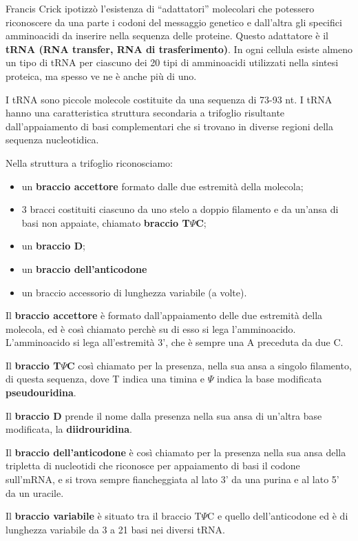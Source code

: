 \documentclass[]{article}
\begin{document}
Francis Crick ipotizzò l'esistenza di ``adattatori'' molecolari che
potessero riconoscere da una parte i codoni del messaggio genetico e
dall'altra gli specifici amminoacidi da inserire nella sequenza delle
proteine. Questo adattatore è il \textbf{tRNA (RNA transfer, RNA di
trasferimento)}. In ogni cellula esiste almeno un tipo di tRNA per
ciascuno dei 20 tipi di amminoacidi utilizzati nella sintesi proteica,
ma spesso ve ne è anche più di uno.

I tRNA sono piccole molecole costituite da una sequenza di 73-93 nt. I
tRNA hanno una caratteristica struttura secondaria a trifoglio
risultante dall'appaiamento di basi complementari che si trovano in
diverse regioni della sequenza nucleotidica.

Nella struttura a trifoglio riconosciamo:

\begin{itemize}
\itemsep1pt\parskip0pt
\item
  un \textbf{braccio accettore} formato dalle due estremità della
  molecola;
\item
  3 bracci costituiti ciascuno da uno stelo a doppio filamento e da
  un'ansa di basi non appaiate, chiamato \textbf{braccio T\(\Psi\)C};
\item
  un \textbf{braccio D};
\item
  un \textbf{braccio dell'anticodone}
\item
  un braccio accessorio di lunghezza variabile (a volte).
\end{itemize}

Il \textbf{braccio accettore} è formato dall'appaiamento delle due
estremità della molecola, ed è così chiamato perchè su di esso si lega
l'amminoacido. L'amminoacido si lega all'estremità 3', che è sempre una
A preceduta da due C.

Il \textbf{braccio T\(\Psi\)C} così chiamato per la presenza, nella sua
ansa a singolo filamento, di questa sequenza, dove T indica una timina e
\(\Psi\) indica la base modificata \textbf{pseudouridina}.

Il \textbf{braccio D} prende il nome dalla presenza nella sua ansa di
un'altra base modificata, la \textbf{diidrouridina}.

Il \textbf{braccio dell'anticodone} è così chiamato per la presenza
nella sua ansa della tripletta di nucleotidi che riconosce per
appaiamento di basi il codone sull'mRNA, e si trova sempre fiancheggiata
al lato 3' da una purina e al lato 5' da un uracile.

Il \textbf{braccio variabile} è situato tra il braccio T\(\Psi\)C e
quello dell'anticodone ed è di lunghezza variabile da 3 a 21 basi nei
diversi tRNA.
\end{document}
